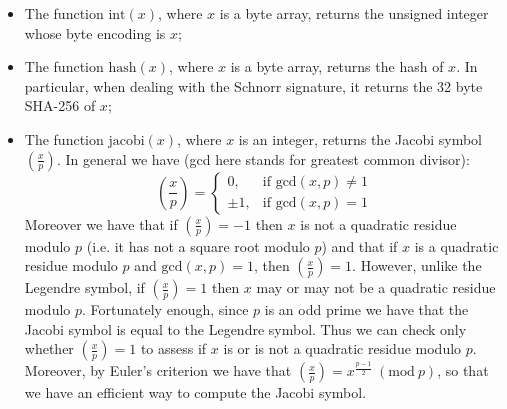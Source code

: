 \begin{itemize}
\begin{itemize}
		\item The function $\text{int}(x)$, where $x$ is a byte array, returns the unsigned integer whose byte encoding is $x$;
		\item The function $\text{hash}(x)$, where $x$ is a byte array, returns the hash of $x$. In particular, when dealing with the Schnorr signature, it returns the 32 byte SHA-256 of $x$;
		\item The function $\text{jacobi}(x)$, where $x$ is an integer, returns the Jacobi symbol $\left(\frac{x}{p}\right)$. In general we have (gcd here stands for greatest common divisor): $$\left(\frac{x}{p}\right)= \begin{cases} 0, & \text{if gcd}(x, p) \neq 1 \\ \pm 1, & \mbox{if gcd}(x, p) = 1 \end{cases}$$
		Moreover we have that if $\left(\frac{x}{p}\right) = - 1$ then $x$ is not a quadratic residue modulo $p$ (i.e. it has not a square root modulo $p$) and that if $x$ is a quadratic residue modulo $p$ and $\text{gcd}(x, p) = 1$, then $\left(\frac{x}{p}\right) = 1$. However, unlike the Legendre symbol, if $\left(\frac{x}{p}\right) = 1$ then $x$ may or may not be a quadratic residue modulo $p$. Fortunately enough, since $p$ is an odd prime we have that the Jacobi symbol is equal to the Legendre symbol. Thus we can check only whether $\left(\frac{x}{p}\right) = 1$ to assess if $x$ is or is not a quadratic residue modulo $p$.
		\\
		Moreover, by Euler's criterion we have that $\left(\frac{x}{p}\right) = x^{\frac{p - 1}{2}} \ (\text{mod} \ p)$, so that we have an efficient way to compute the Jacobi symbol.
	\end{itemize}	
\end{itemize}